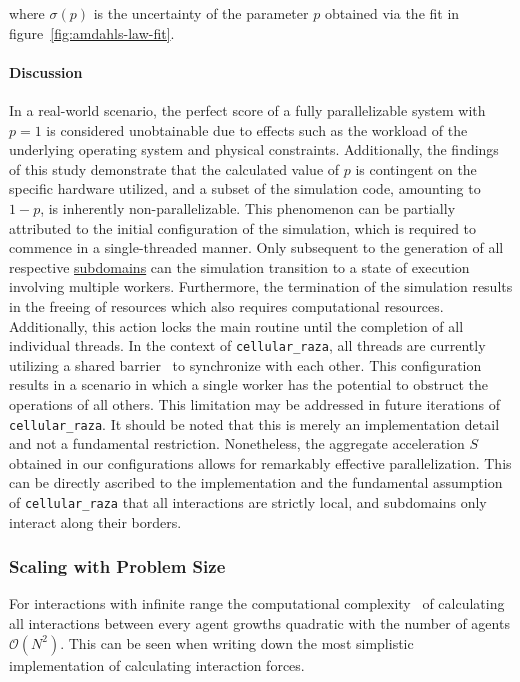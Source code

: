 where $\sigma(p)$ is the uncertainty of the parameter $p$ obtained via the fit in
figure~\ref{fig:amdahls-law-fit}.

\paragraph{Discussion}
In a real-world scenario, the perfect score of a fully parallelizable system with $p=1$ is
considered unobtainable due to effects such as the workload of the underlying operating system and
physical constraints.
Additionally, the findings of this study demonstrate that the calculated value of $p$ is contingent
on the specific hardware utilized, and a subset of the simulation code, amounting to $1-p$, is
inherently non-parallelizable.
This phenomenon can be partially attributed to the initial configuration of the simulation, which is
required to commence in a single-threaded manner.
Only subsequent to the generation of all respective
\href{https://cellular-raza.com/docs/cellular_raza_core/backend/chili/struct.SubDomainBox.html}
{subdomains} can the simulation transition to a state of execution involving multiple workers.
Furthermore, the termination of the simulation results in the freeing of resources which also
requires computational resources.
Additionally, this action locks the main routine until the completion of all individual threads.
In the context of \texttt{cellular\_raza}, all threads are currently utilizing a shared
barrier~\cite{GjengsetHurdles2018} to synchronize with each other.
This configuration results in a scenario in which a single worker has the potential to obstruct the
operations of all others.
This limitation may be addressed in future iterations of \texttt{cellular\_raza}.
It should be noted that this is merely an implementation detail and not a fundamental restriction.
Nonetheless, the aggregate acceleration $S$ obtained in our configurations allows for remarkably
effective parallelization.
This can be directly ascribed to the implementation and the fundamental assumption of
\texttt{cellular\_raza} that all interactions are strictly local, and subdomains only interact along
their borders.

\subsubsection{Scaling with Problem Size}
For interactions with infinite range the computational complexity~\cite{Knuth1976} of calculating
all interactions between every agent growths quadratic with the number of agents $\mathcal{O}(N^2)$.
This can be seen when writing down the most simplistic implementation of calculating interaction
forces.

